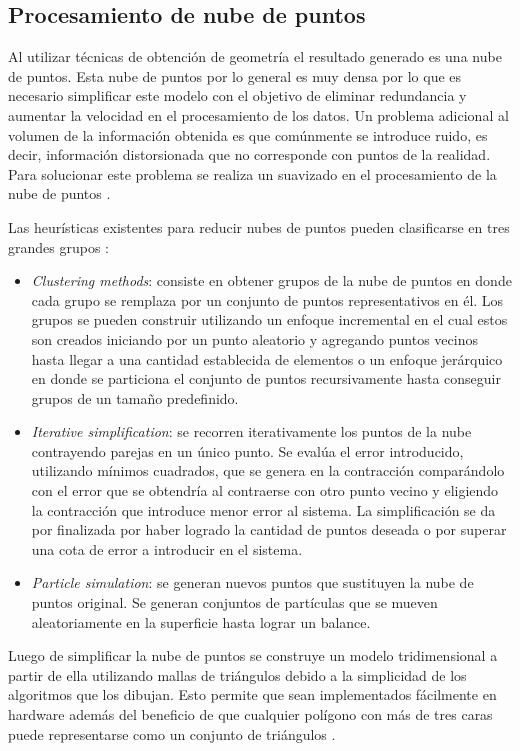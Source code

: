 \subsection{Procesamiento de nube de puntos}

Al utilizar técnicas de obtención de geometría el resultado generado es una nube de puntos. Esta nube de puntos por lo general es muy densa por lo que es necesario simplificar este modelo con el objetivo de eliminar redundancia y aumentar la velocidad en el procesamiento de los datos. Un problema adicional al volumen de la información obtenida es que comúnmente se introduce ruido, es decir, información distorsionada que no corresponde con puntos de la realidad. Para solucionar este problema se realiza un suavizado en el procesamiento de la nube de puntos \cite{PCloudSimplify}.

Las heurísticas existentes para reducir nubes de puntos pueden clasificarse en tres grandes grupos \cite{PntCloud}:
\begin{itemize}
   \item \emph{Clustering methods}: consiste en obtener grupos de la nube de puntos en donde cada grupo se remplaza por un conjunto de puntos representativos en él. Los grupos se pueden construir utilizando un enfoque incremental en el cual estos son creados iniciando por un punto aleatorio y agregando puntos vecinos hasta llegar a una cantidad establecida de elementos o un enfoque jerárquico en donde se particiona el conjunto de puntos recursivamente hasta conseguir grupos de un tamaño predefinido.
   \item \emph{Iterative simplification}: se recorren iterativamente los puntos de la nube contrayendo parejas en un único punto. Se evalúa el error introducido, utilizando mínimos cuadrados, que se genera en la contracción comparándolo con el error que se obtendría al contraerse con otro punto vecino y eligiendo la contracción que introduce menor error al sistema. La simplificación se da por finalizada por haber logrado la cantidad de puntos deseada o por superar una cota de error a introducir en el sistema.
   \item \emph{Particle simulation}: se generan nuevos puntos que sustituyen la nube de puntos original. Se generan conjuntos de partículas que se mueven aleatoriamente en la superficie hasta lograr un balance. %
\end{itemize}

Luego de simplificar la nube de puntos se construye un modelo tridimensional a partir de ella utilizando mallas de triángulos debido a la simplicidad de los algoritmos que los dibujan. Esto permite que sean implementados fácilmente en hardware además del beneficio de que cualquier polígono con más de tres caras puede representarse como un conjunto de triángulos \cite{PCloudTriangle}.

